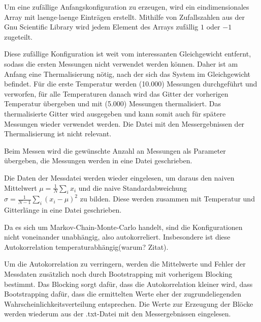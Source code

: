 	Um eine zufällige Anfangskonfiguration zu erzeugen, wird ein eindimensionales Array mit laenge$\cdot$laenge Einträgen erstellt. Mithilfe von Zufallszahlen aus der Gnu Scientific Library \cite{gsldoc} wird jedem Element des Arrays zufällig $1$ oder $-1$ zugeteilt.	
	
	Diese zufällige Konfiguration ist weit vom interessanten Gleichgewicht entfernt, sodass die ersten Messungen nicht verwendet werden können. Daher ist am Anfang eine Thermalisierung nötig, nach der sich das System im Gleichgewicht befindet. Für die erste Temperatur werden (10.000) Messungen durchgeführt und verworfen, für alle Temperaturen danach wird das Gitter der vorherigen Temperatur übergeben und mit (5.000) Messungen thermalisiert. Das thermalisierte Gitter wird ausgegeben und kann somit auch für spätere Messungen wieder verwendet werden. Die Datei mit den Messergebnissen der Thermalisierung ist nicht relevant.
	
	Beim Messen wird die gewünschte Anzahl an Messungen als Parameter übergeben, die Messungen werden in eine Datei geschrieben.
	
	
	
	Die Daten der Messdatei werden wieder eingelesen, um daraus den naiven Mittelwert $\mu=\frac{1}{N}\sum_{i} x_i$ und die naive Standardabweichung $\sigma=\frac{1}{N-1}\sum_{i}(x_i-\mu)^2$ zu bilden. Diese werden zusammen mit Temperatur und Gitterlänge in eine Datei geschrieben.
	
	Da es sich um Markov-Chain-Monte-Carlo handelt, sind die Konfigurationen nicht voneinander unabhängig, also autokorreliert. Insbesondere ist diese Autokorrelation temperaturabhängig(warum? Zitat).
	
	Um die Autokorrelation zu verringern, werden die Mittelwerte und Fehler der Messdaten zusätzlich noch durch Bootstrapping mit vorherigem Blocking bestimmt. Das Blocking sorgt dafür, dass die Autokorrelation kleiner wird, dass Bootstrapping dafür, dass die ermittelten Werte eher der zugrundeliegenden Wahrscheinlichkeitsverteilung entsprechen. Die Werte zur Erzeugung der Blöcke werden wiederum aus der .txt-Datei mit den Messergebnissen eingelesen.
	
